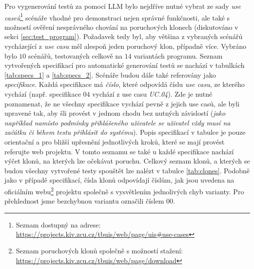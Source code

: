 \documentclass[czech, ma, kiv, he, iso690alph, pdf, viewonly]{fasthesis}
\begin{document}
    Pro vygenerování testů za pomocí LLM bylo nejdříve nutné vybrat ze sady \textit{use caseů}\footnote{Seznam dostupný na adrese: \url{https://projects.kiv.zcu.cz/tbuis/web/page/uis#use-cases}} scénáře vhodné pro demonstraci nejen správné funkčnosti, ale také s možností ověření nesprávného chování na poruchových klonech (diskutováno v sekci \ref{sec:test_program}). Požadavek tedy byl, aby většina z vybraných scénářů vycházející z \textit{use casu} měl alespoň jeden poruchový klon, případně více. Vybráno bylo \(10\) scénářů, testovaných celkově na \(14\) variantách programu. Seznam vytvořených specifikací pro automatické generování testů se nachází v tabulkách \ref{tab:specs_1} a \ref{tab:specs_2}. Scénáře budou dále také referovány jako \textit{specifikace}. Každá specifikace má \textit{číslo}, které odpovídá číslu \textit{use casu}, ze kterého vychází (např. specifikace \(04\) vychází z use casu \textit{UC.04}). Zde je nutné poznamenat, že ne všechny specifikace vychází pevně z jejich use casů, ale byli upravené tak, aby šli provést v jednom chodu bez nutných závislostí (\textit{jako například namísto podmínky přihlášeného uživatele se uživatel vždy musí na začátku či během testu přihlásit do systému}). Popis specifikací v tabulce je pouze orientační a pro bližší upřesnění jednotlivých kroků, které se mají provést referujte web projektu. V tomto seznamu se také u každé specifikace nachází výčet klonů, na kterých lze očekávat poruchu. Celkový seznam klonů, a kterých se budou všechny vytvořené testy spouštět lze nalézt v tabulce \ref{tab:clones}. Podobně jako v případě specifikací, čísla klonů odpovídají číslům, jak jsou uvedena na oficiálním webu\footnote{Seznam poruchových klonů společně s možností stažení: \url{https://projects.kiv.zcu.cz/tbuis/web/page/download}} projektu společně s vysvětlením jednolivých chyb varianty. Pro přehlednost jsme bezchybnou variantu označili číslem \(00\).
\end{document}
